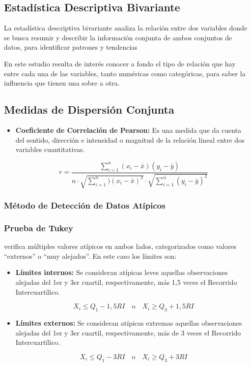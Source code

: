 \documentclass[oneside,11pt]{Latex/Classes/PhDthesisPSnPDF}
\begin{document}
\hfill\break

\subsection{Estadística Descriptiva Bivariante}

La estadística descriptiva bivariante analiza la relación entre dos
variables donde se busca resumir y describir la información conjunta de
ambos conjuntos de datos, para identificar patrones y tendencias

En este estudio resulta de interés conocer a fondo el tipo de relación
que hay entre cada una de las variables, tanto numéricas como
categóricas, para saber la influencia que tienen una sobre a otra.\\

\subsection*{Medidas de Dispersión Conjunta}

\begin{itemize}
\item{\textbf{Coeficiente de Correlación de Pearson:} Es una medida que da cuenta del sentido, dirección e intensidad o magnitud de la relación lineal entre dos variables cuantitativas.}

$$r = \frac{\sum_{i=1}^{n} (x_i - \bar{x})(y_i - \bar{y})}{n\cdot\sqrt{\sum_{i=1}^{n}) (x_i - \bar{x})^2} \cdot \sqrt{\sum_{i=1}^{n} (y_i - \bar{y})^2}}$$
\end{itemize}

\hfill\break

\subsubsection*{Método de Detección de Datos Atípicos}
\subsubsection*{Prueba de Tukey}

verifica múltiples valores atípicos en ambos lados, categorizados como
valores ``externos'' o ``muy alejados''. En este caso los límites son:

\begin{itemize}
\item{\textbf{Límites internos:} Se consideran atípicas leves aquellas observaciones alejadas del 1er y 3er cuartil, respectivamente, más 1,5 veces el Recorrido Intercuartílico.}

$$X_i \le Q_1 - 1,5RI \quad \text{o} \quad X_i \ge Q_3 + 1,5RI$$

\item{\textbf{Límites externos:} Se consideran atípicas extremas aquellas observaciones alejadas del 1er y 3er cuartil, respectivamente, más de 3 veces el Recorrido Intercuartílico.}

$$X_i \le Q_1 - 3RI \quad \text{o} \quad X_i \ge Q_3 + 3RI$$
\end{itemize}
\end{document}
